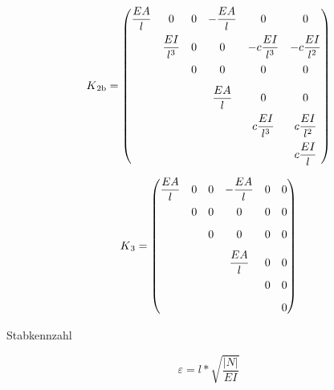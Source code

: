 \begin{equation} \label{K2b}
K\textsubscript{2b} = \begin{pmatrix}
\dfrac{EA}{l} & 0                   & 0                   & -\dfrac{EA}{l}  & 0                   & 0                   \\[0.8em]
              & \dfrac{EI}{l^3}     & 0                   & 0               & -c\dfrac{EI}{l^3}   & -c\dfrac{EI}{l^2}   \\[0.8em]
              &                     & 0                   & 0               & 0                   & 0                   \\[0.8em]
              &                     &                     & \dfrac{EA}{l}   & 0                   & 0                   \\[0.8em]
              &                     &                     &                 & c\dfrac{EI}{l^3}    & c\dfrac{EI}{l^2}    \\[0.8em]
              &                     &                     &                 &                     & c\dfrac{EI}{l}
     \end{pmatrix}
\end{equation}

\begin{equation} \label{K3}
K\textsubscript{3} = \begin{pmatrix}
\dfrac{EA}{l} & 0                   & 0                   & -\dfrac{EA}{l}  & 0                   & 0                   \\[0.8em]
              & 0                   & 0                   & 0               & 0                   & 0                   \\[0.8em]
              &                     & 0                   & 0               & 0                   & 0                   \\[0.8em]
              &                     &                     & \dfrac{EA}{l}   & 0                   & 0                   \\[0.8em]
              &                     &                     &                 & 0                   & 0                   \\[0.8em]
              &                     &                     &                 &                     & 0
     \end{pmatrix}
\end{equation}

Stabkennzahl 

\begin{equation} \label{e}
\varepsilon = l * \sqrt{\frac{|N|}{EI}}
\end{equation}


